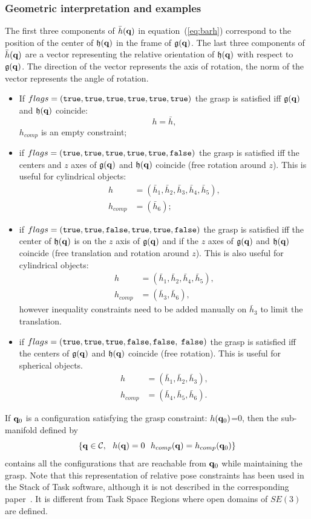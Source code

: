 \subsubsection{Geometric interpretation and examples}
The first three components of $\bar{h}(\mathbf{q})$ in equation~(\ref{eq:barh}) correspond to the position of the center of $\mathfrak{h}(\mathbf{q})$ in the frame of $\mathfrak{g}(\mathbf{q})$. The last three components of $\bar{h}(\mathbf{q})$ are a vector representing the relative orientation of $\mathfrak{h}(\mathbf{q})$ with respect to $\mathfrak{g}(\mathbf{q})$. The direction of the vector represents the axis of rotation, the norm of the vector represents the angle of rotation.
\begin{itemize}
\item If $flags=(\texttt{true},\texttt{true},\texttt{true},\texttt{true},\texttt{true},\texttt{true})$ the grasp is satisfied iff $\mathfrak{g}(\mathbf{q})$ and $\mathfrak{h}(\mathbf{q})$ coincide:
  $$ h =\bar{h},$$
  $h_{comp}$ is an empty constraint;
\item if $flags=(\texttt{true},\texttt{true},\texttt{true},\texttt{true},\texttt{true},\texttt{false})$ the grasp is satisfied iff the centers and $z$ axes of $\mathfrak{g}(\mathbf{q})$ and $\mathfrak{h}(\mathbf{q})$ coincide (free rotation around $z$). This is useful for cylindrical objects:
  \begin{align*}
    h &= (\bar{h}_1,\bar{h}_2,\bar{h}_3,\bar{h}_4,\bar{h}_5),\\
    h_{comp} &= (\bar{h}_6);
  \end{align*}
\item {\color{blue}if $flags=(\texttt{true},\texttt{true},\texttt{false},\texttt{true},\texttt{true},\texttt{false})$
  the grasp is satisfied iff the center of $\mathfrak{h}(\mathbf{q})$ is on the
  $z$ axis of $\mathfrak{g}(\mathbf{q})$ and if the $z$ axes of
  $\mathfrak{g}(\mathbf{q})$ and $\mathfrak{h}(\mathbf{q})$ coincide (free translation
  and rotation around $z$). This is also useful for cylindrical
  objects:
  \begin{align*}
    h &= (\bar{h}_1,\bar{h}_2,\bar{h}_4,\bar{h}_5),\\
    h_{comp} &= (\bar{h}_3,\bar{h}_6),
  \end{align*}
  however inequality constraints need to be added manually on $\bar{h}_3$ to
  limit the translation.
  }
\item if $flags=(\texttt{true},\texttt{true},\texttt{true},\texttt{false},\texttt{false},$ $\texttt{false})$ the grasp is satisfied iff the centers of $\mathfrak{g}(\mathbf{q})$ and $\mathfrak{h}(\mathbf{q})$ coincide (free rotation). This is useful for spherical objects.
  \begin{align*}
    h &= (\bar{h}_1,\bar{h}_2,\bar{h}_3),\\
    h_{comp} &= (\bar{h}_4,\bar{h}_5,\bar{h}_6).
  \end{align*}
\end{itemize}
If $\mathbf{q}_0$ is a configuration satisfying the grasp constraint: $h(\mathbf{q}_0)$=0, then the sub-manifold defined by
$$
\left\{\conf\in\CS,\ \ h(\conf)=0\ \ h_{comp}(\conf) =  h_{comp}(\conf_0)\right\}
$$
contains all the configurations that are reachable from $\mathbf{q}_0$ while maintaining the grasp. Note that this representation of relative pose constraints has been used in the Stack of Task software, although it is not described in the corresponding paper~\cite{SoT}. It is different from Task Space Regions \cite{berenson2011} where open domains of $SE(3)$ are defined.

